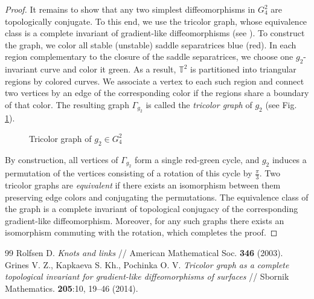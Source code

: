 \documentclass[10pt,a4paper]{amsart}
\begin{document}
\begin{proof}
		It remains to show that any two simplest diffeomorphisms in $G_4^2$ are topologically conjugate. To this end, we use the tricolor graph, whose equivalence class is a complete invariant of gradient-like diffeomorphisms (see \cite{treh}). To construct the graph, we color all stable (unstable) saddle separatrices blue (red). In each region complementary to the closure of the saddle separatrices, we choose one $g_2$-invariant curve and color it green. As a result, $\mathbb T^2$ is partitioned into triangular regions by colored curves. We associate a vertex to each such region and connect two vertices by an edge of the corresponding color if the regions share a boundary of that color. The resulting graph $\Gamma_{g_{2}}$ is called the {\it tricolor graph} of $g_{2}$ (see Fig. \ref{gr1}). 
		\begin{figure}[h]		
			\centerline{}		
			\caption{\small Tricolor graph of $g_{2}\in G^2_4$}\label{gr1}	
		\end{figure}
		
		By construction, all vertices of $\Gamma_{g_{2}}$ form a single red-green cycle, and $g_{2}$ induces a permutation of the vertices consisting of a rotation of this cycle by $\frac{\pi}{3}$. Two tricolor graphs are {\it equivalent} if there exists an isomorphism between them preserving edge colors and conjugating the permutations. The equivalence class of the graph is a complete invariant of topological conjugacy of the corresponding gradient-like diffeomorphism. Moreover, for any such graphs there exists an isomorphism commuting with the rotation, which completes the proof.	
	\end{proof}

\begin{thebibliography}{99}
 Rolfsen D. {\it Knots and links} // American Mathematical Soc. {\bf 346} (2003).
 Grines V. Z., Kapkaeva S. Kh., Pochinka O. V. {\it Tricolor graph as a complete topological invariant for gradient-like diffeomorphisms of surfaces} // Sbornik Mathematics. {\bf 205}:10, 19--46 (2014).
\end{thebibliography}
\end{document}
